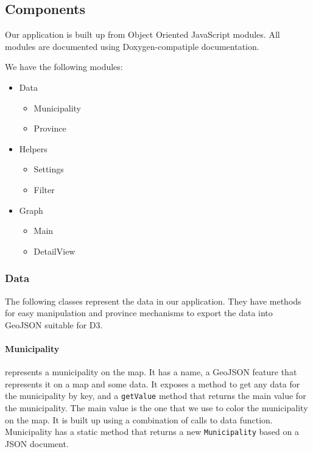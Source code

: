	\subsection{Components}
		Our application is built up from Object Oriented JavaScript modules.
		All modules are documented using Doxygen-compatiple documentation.

		We have the following modules:

		\begin{itemize}
			\item Data
				\begin{itemize}
					\item Municipality
					\item Province
				\end{itemize}
			\item Helpers
				\begin{itemize}
					\item Settings
					\item Filter
				\end{itemize}
			\item Graph
				\begin{itemize}
					\item Main
					\item DetailView
				\end{itemize}
		\end{itemize}

		\subsubsection{Data}
			The following classes represent the data in our application.
			They have methods for easy manipulation and province mechanisms to export the data into GeoJSON suitable for D3.

			\paragraph{Municipality} represents a municipality on the map.
				It has a name, a GeoJSON feature that represents it on a map and some data.
				It exposes a method to get any data for the municipality by key, and a \texttt{getValue} method that returns the main value for the municipality.
				The main value is the one that we use to color the municipality on the map.
				It is built up using a combination of calls to data function.
				Municipality has a static method that returns a new \texttt{Municipality} based on a JSON document.

